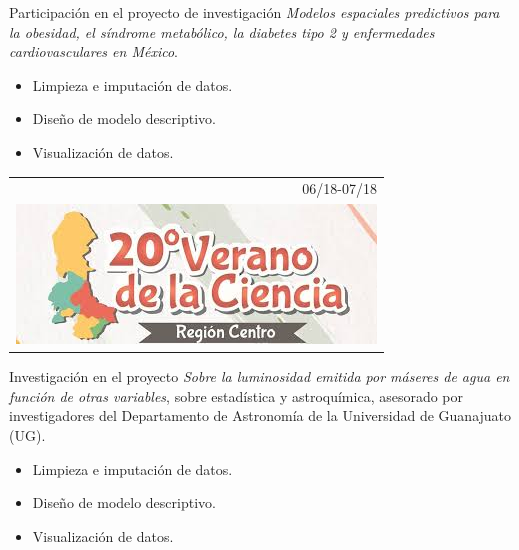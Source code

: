 \documentclass[]{friggeri-cv}
\begin{document}
\begin{entrylist}
    { }
    {Participación en el proyecto de investigación \textsl{Modelos espaciales predictivos para la obesidad, el síndrome metabólico, la diabetes tipo 2 y enfermedades cardiovasculares en México}.
    \begin{itemize}
	\item Limpieza e imputación de datos.
	\item Diseño de modelo descriptivo.
	\item Visualización de datos.
\end{itemize}}
  \entry
    {\begin{tabular}{r}
    		06/18-07/18\\
     		\includegraphics[scale=0.203]{img/20verano.jpeg}
	\end{tabular}\hspace{0.4cm}
    }
    {\vspace{-0.98cm}}
    { }
    {Investigación en el proyecto \textsl{Sobre la luminosidad emitida por máseres de agua en función de otras variables}, sobre estadística y astroquímica, asesorado por investigadores del Departamento de Astronomía de la Universidad de Guanajuato (UG).
    \begin{itemize}
	\item Limpieza e imputación de datos.
	\item Diseño de modelo descriptivo.
	\item Visualización de datos.
\end{itemize}}%
\end{entrylist}
\end{document}
